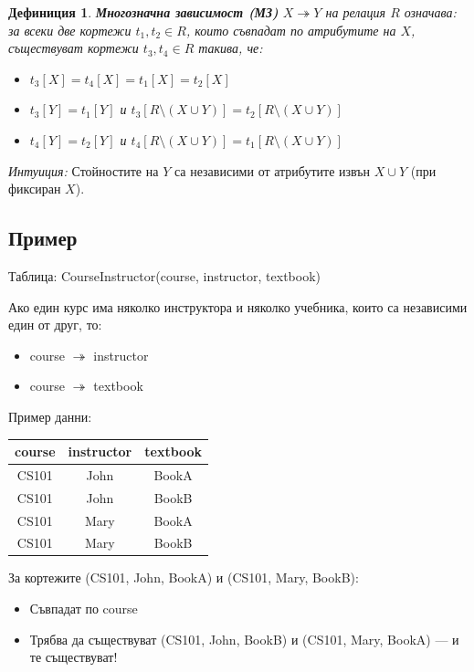 \documentclass{scrartcl}
\newtheorem{definition}{Дефиниция}
\begin{document}
\begin{FlushLeft}
\begin{definition}
\textbf{\textit{Многозначна зависимост (МЗ)}} $X \twoheadrightarrow Y$ на релация $R$ означава: за всеки две кортежи $t_1, t_2 \in R$, които съвпадат по атрибутите на $X$, съществуват кортежи $t_3, t_4 \in R$ такива, че:

\begin{itemize}
    \item $t_3[X] = t_4[X] = t_1[X] = t_2[X]$
    \item $t_3[Y] = t_1[Y]$ и $t_3[R \setminus (X \cup Y)] = t_2[R \setminus (X \cup Y)]$
    \item $t_4[Y] = t_2[Y]$ и $t_4[R \setminus (X \cup Y)] = t_1[R \setminus (X \cup Y)]$
\end{itemize}
\end{definition}

\textit{Интуиция:} Стойностите на $Y$ са независими от атрибутите извън $X \cup Y$ (при фиксиран $X$).

\subsection{Пример}

Таблица: CourseInstructor(course, instructor, textbook)

Ако един курс има няколко инструктора и няколко учебника, които са независими един от друг, то:
\begin{itemize}
    \item course $\twoheadrightarrow$ instructor
    \item course $\twoheadrightarrow$ textbook
\end{itemize}

Пример данни:

\begin{center}
\begin{tabular}{|c|c|c|}
\hline
course & instructor & textbook \\
\hline
CS101 & John & BookA \\
CS101 & John & BookB \\
CS101 & Mary & BookA \\
CS101 & Mary & BookB \\
\hline
\end{tabular}
\end{center}

За кортежите (CS101, John, BookA) и (CS101, Mary, BookB):
\begin{itemize}
    \item Съвпадат по course
    \item Трябва да съществуват (CS101, John, BookB) и (CS101, Mary, BookA) --- и те съществуват!
\end{itemize}


\end{FlushLeft}
\end{document}
